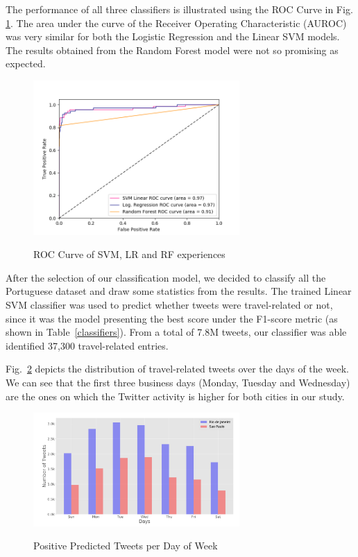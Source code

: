 The performance of all three classifiers is illustrated using the ROC Curve in Fig. \ref{fig:roc_curve}. The area under the curve of the Receiver Operating Characteristic (AUROC) was very similar for both the Logistic Regression and the Linear SVM models. The results obtained from the Random Forest model were not so promising as expected.

\begin{figure}[!htbp]
  \caption{ROC Curve of SVM, LR and RF experiences}
  \centering
  \includegraphics[width=0.7\textwidth]{figures/roc_auc_brazilian_travel_related}
  \label{fig:roc_curve}
\end{figure}

After the selection of our classification model, we decided to classify all the Portuguese dataset and draw some statistics from the results. The trained Linear SVM classifier was used to predict whether tweets were travel-related or not, since it was the model presenting the best score under the F1-score metric (as shown in Table~\ref{classifiers}). From a total of 7.8M tweets, our classifier was able identified 37,300 travel-related entries.

Fig.~\ref{predicted} depicts the distribution of travel-related tweets over the days of the week. We can see that the first three business days (Monday, Tuesday and Wednesday) are the ones on which the Twitter activity is higher for both cities in our study.

\begin{figure}[!htbp]
  \caption{Positive Predicted Tweets per Day of Week}
  \centering
    \includegraphics[width=0.7\textwidth]{figures/predicted_day_of_week}
    \label{predicted}
\end{figure}


